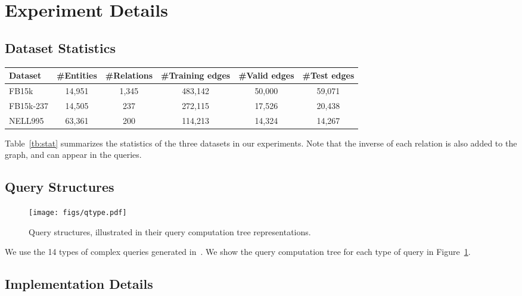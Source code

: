\section{Experiment Details}

\subsection{Dataset Statistics}
\label{app:stat}

\begin{table*}[!h]
\centering
\begin{tabular}{lccccc}
\toprule
\bf{Dataset} & \bf{\#Entities} & \bf{\#Relations} & \bf{\#Training edges} & \bf{\#Valid edges} & \bf{\#Test edges} \\
\midrule
FB15k & 14,951 & 1,345 & 483,142 & 50,000 & 59,071 \\
FB15k-237 & 14,505 & 237 & 272,115 & 17,526 & 20,438 \\
NELL995 & 63,361 & 200 & 114,213 & 14,324 & 14,267 \\
\toprule
\end{tabular}
\caption{Statistics of the three knowledge graph datasets.}
\label{tb:stat}
\end{table*}

Table~\ref{tb:stat} summarizes the statistics of the three datasets in our experiments.
Note that the inverse of each relation is also added to the graph, and can appear in the queries.

\subsection{Query Structures}
\label{app:query}

\begin{figure}[htbp]
\centering
\texttt{[image: figs/qtype.pdf]}
\caption{Query structures, illustrated in their query computation tree representations.}
\label{fig:qtype}
\end{figure}

We use the 14 types of complex queries generated in~\cite{ren2019query2box, ren2020beta}. We show the query computation tree for each type of query in Figure~\ref{fig:qtype}.

\subsection{Implementation Details}
\label{app:detail}

